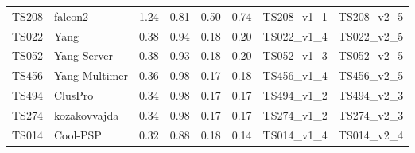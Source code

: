 \begin{table}[ht]
{\begin{tabular}{llllllll}
TS208 & falcon2 & 1.24 & 0.81 & 0.50 & 0.74 & TS208\_v1\_1 & TS208\_v2\_5 \\ 
TS022 & Yang & 0.38 & 0.94 & 0.18 & 0.20 & TS022\_v1\_4 & TS022\_v2\_5 \\ 
TS052 & Yang-Server & 0.38 & 0.93 & 0.18 & 0.20 & TS052\_v1\_3 & TS052\_v2\_5 \\ 
TS456 & Yang-Multimer & 0.36 & 0.98 & 0.17 & 0.18 & TS456\_v1\_4 & TS456\_v2\_5 \\ 
TS494 & ClusPro & 0.34 & 0.98 & 0.17 & 0.17 & TS494\_v1\_2 & TS494\_v2\_3 \\ 
TS274 & kozakovvajda & 0.34 & 0.98 & 0.17 & 0.17 & TS274\_v1\_2 & TS274\_v2\_3 \\ 
TS014 & Cool-PSP & 0.32 & 0.88 & 0.18 & 0.14 & TS014\_v1\_4 & TS014\_v2\_4 \\ 
\bottomrule
\end{tabular}%
}
\end{table}
